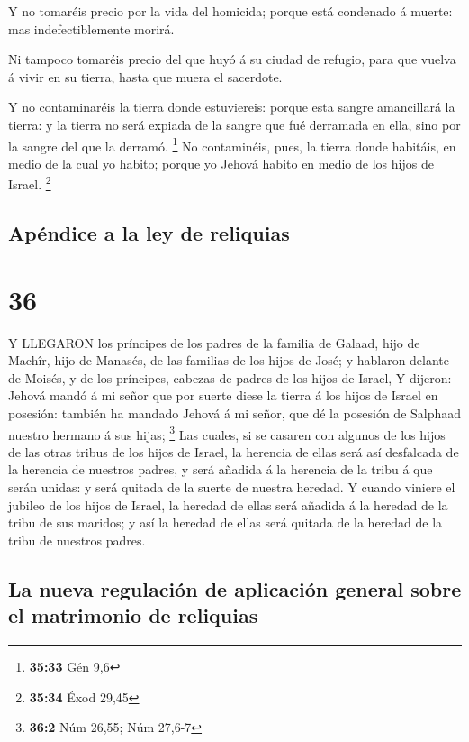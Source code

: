  Y no tomaréis precio por la vida del homicida; porque está
condenado á muerte: mas indefectiblemente morirá.

 Ni tampoco tomaréis precio del que huyó á su ciudad de
refugio, para que vuelva á vivir en su tierra, hasta que muera el
sacerdote.

 Y no contaminaréis la tierra donde estuviereis: porque
esta sangre amancillará la tierra: y la tierra no será expiada de la
sangre que fué derramada en ella, sino por la sangre del que la derramó.
\footnote{\textbf{35:33} Gén 9,6}  No contaminéis, pues, la
tierra donde habitáis, en medio de la cual yo habito; porque yo Jehová
habito en medio de los hijos de Israel. \footnote{\textbf{35:34} Éxod
  29,45}

\hypertarget{apuxe9ndice-a-la-ley-de-reliquias}{%
\subsection{Apéndice a la ley de
reliquias}\label{apuxe9ndice-a-la-ley-de-reliquias}}

\hypertarget{section-35}{%
\section{36}\label{section-35}}

 Y LLEGARON los príncipes de los padres de la familia de
Galaad, hijo de Machîr, hijo de Manasés, de las familias de los hijos de
José; y hablaron delante de Moisés, y de los príncipes, cabezas de
padres de los hijos de Israel,  Y dijeron: Jehová mandó á mi
señor que por suerte diese la tierra á los hijos de Israel en posesión:
también ha mandado Jehová á mi señor, que dé la posesión de Salphaad
nuestro hermano á sus hijas; \footnote{\textbf{36:2} Núm 26,55; Núm
  27,6-7}  Las cuales, si se casaren con algunos de los
hijos de las otras tribus de los hijos de Israel, la herencia de ellas
será así desfalcada de la herencia de nuestros padres, y será añadida á
la herencia de la tribu á que serán unidas: y será quitada de la suerte
de nuestra heredad.  Y cuando viniere el jubileo de los
hijos de Israel, la heredad de ellas será añadida á la heredad de la
tribu de sus maridos; y así la heredad de ellas será quitada de la
heredad de la tribu de nuestros padres.

\hypertarget{la-nueva-regulaciuxf3n-de-aplicaciuxf3n-general-sobre-el-matrimonio-de-reliquias}{%
\subsection{La nueva regulación de aplicación general sobre el
matrimonio de
reliquias}\label{la-nueva-regulaciuxf3n-de-aplicaciuxf3n-general-sobre-el-matrimonio-de-reliquias}}

